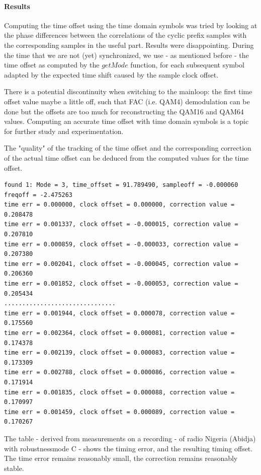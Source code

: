 \documentclass[11pt]{article}
\begin{document}
\paragraph{Results}
Computing the time offset using the time domain symbols was
tried 
by looking at the phase differences between the correlations of the
cyclic prefix samples with the corresponding samples in the useful part.
Results were disappointing. During the time that we are
not (yet) synchronized, we use - as mentioned before - the time
offset as computed by the $getMode$ function, for each subsequent
symbol adapted by the expected time shift caused by the sample clock offset.

There is a potential discontinuity 
when switching to the mainloop: the first time offset value
maybe a little off, such that FAC (i.e. QAM4) demodulation can be done
but the offsets are too much for reconstructing the QAM16 and QAM64
values.
Computing an accurate time offset with time domain symbols is a topic
for further study and experimentation.

The "quality" of the tracking of the time offset  and the
corresponding correction of the actual time offset can be deduced
from the  computed values for the time offset.
{\small
\begin{verbatim}
found 1: Mode = 3, time_offset = 91.789490, sampleoff = -0.000060 freqoff = -2.475263
time err = 0.000000, clock offset = 0.000000, correction value = 0.208478
time err = 0.001337, clock offset = -0.000015, correction value = 0.207810
time err = 0.000859, clock offset = -0.000033, correction value = 0.207380
time err = 0.002041, clock offset = -0.000045, correction value = 0.206360
time err = 0.001852, clock offset = -0.000053, correction value = 0.205434
...............................
time err = 0.001944, clock offset = 0.000078, correction value = 0.175560
time err = 0.002364, clock offset = 0.000081, correction value = 0.174378
time err = 0.002139, clock offset = 0.000083, correction value = 0.173309
time err = 0.002788, clock offset = 0.000086, correction value = 0.171914
time err = 0.001835, clock offset = 0.000088, correction value = 0.170997
time err = 0.001459, clock offset = 0.000089, correction value = 0.170267
\end{verbatim}
}

The table - derived from measurements on a recording - of radio Nigeria
(Abidja) with robustnessmode C - shows the timing error, and the resulting timing offset.
The time error remains reasonably small, the correction
remains reasonably stable. 
\end{document}
